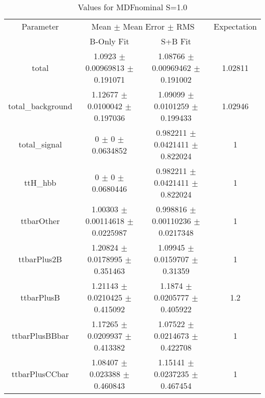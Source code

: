 \begin{table}
\centering
\caption{Values for MDFnominal S=1.0}
\begin{tabular}{cccc}
\toprule
Parameter & \multicolumn{2}{c}{Mean $\pm$ Mean Error $\pm$ RMS} & Expectation\\
 & B-Only Fit & S+B Fit & \\
\midrule
total & \num{1.0923} $\pm$ \num{0.00969813} $\pm$ \num{0.191071} & \num{1.08766} $\pm$ \num{0.00969462} $\pm$ \num{0.191002} & \num{1.02811}\\
total\_background & \num{1.12677} $\pm$ \num{0.0100042} $\pm$ \num{0.197036} & \num{1.09099} $\pm$ \num{0.0101259} $\pm$ \num{0.199433} & \num{1.02946}\\
total\_signal & \num{0} $\pm$ \num{0} $\pm$ \num{0.0634852} & \num{0.982211} $\pm$ \num{0.0421411} $\pm$ \num{0.822024} & \num{1}\\
ttH\_hbb & \num{0} $\pm$ \num{0} $\pm$ \num{0.0680446} & \num{0.982211} $\pm$ \num{0.0421411} $\pm$ \num{0.822024} & \num{1}\\
ttbarOther & \num{1.00303} $\pm$ \num{0.00114618} $\pm$ \num{0.0225987} & \num{0.998816} $\pm$ \num{0.00110236} $\pm$ \num{0.0217348} & \num{1}\\
ttbarPlus2B & \num{1.20824} $\pm$ \num{0.0178995} $\pm$ \num{0.351463} & \num{1.09945} $\pm$ \num{0.0159707} $\pm$ \num{0.31359} & \num{1}\\
ttbarPlusB & \num{1.21143} $\pm$ \num{0.0210425} $\pm$ \num{0.415092} & \num{1.1874} $\pm$ \num{0.0205777} $\pm$ \num{0.405922} & \num{1.2}\\
ttbarPlusBBbar & \num{1.17265} $\pm$ \num{0.0209937} $\pm$ \num{0.413382} & \num{1.07522} $\pm$ \num{0.0214673} $\pm$ \num{0.422708} & \num{1}\\
ttbarPlusCCbar & \num{1.08407} $\pm$ \num{0.023388} $\pm$ \num{0.460843} & \num{1.15141} $\pm$ \num{0.0237235} $\pm$ \num{0.467454} & \num{1}\\
\bottomrule
\end{tabular}
\end{table}
